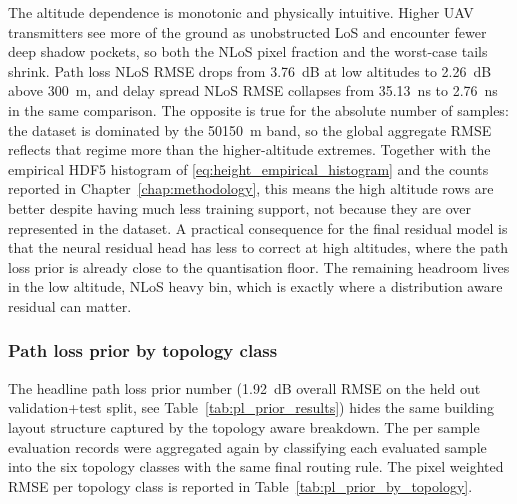 The altitude dependence is monotonic and physically intuitive. Higher UAV
transmitters see more of the ground as unobstructed LoS and encounter fewer
deep shadow pockets, so both the NLoS pixel fraction and the worst-case tails
shrink. Path loss NLoS RMSE drops from \SI{3.76}{dB} at low altitudes to
\SI{2.26}{dB} above \SI{300}{m}, and delay spread NLoS RMSE collapses from
\SI{35.13}{ns} to \SI{2.76}{ns} in the same comparison. The opposite is true
for the absolute number of samples: the dataset is dominated by the
\SI{50}{\mathrm{-}}\SI{150}{m} band, so the global aggregate RMSE reflects that
regime more than the higher-altitude extremes. Together with the empirical HDF5
histogram of \eqref{eq:height_empirical_histogram} and the counts reported in
Chapter~\ref{chap:methodology}, this means the high altitude rows are better
despite having much less training support, not because they are
over represented in the dataset. A practical consequence for
the final residual model is that the neural residual head has less to correct at high altitudes,
where the path loss prior is already close to the quantisation floor. The
remaining headroom lives in the low altitude, NLoS heavy bin, which is exactly
where a distribution aware residual can matter.

\subsubsection{Path loss prior by topology class}

The headline path loss prior number (\SI{1.92}{dB} overall RMSE on the
held out validation+test split, see Table~\ref{tab:pl_prior_results}) hides the
same building layout structure captured by the topology aware breakdown. The per sample evaluation
records were aggregated again by classifying each evaluated sample into the six
topology classes with the same final routing rule. The pixel weighted RMSE per topology class is
reported in Table~\ref{tab:pl_prior_by_topology}.

